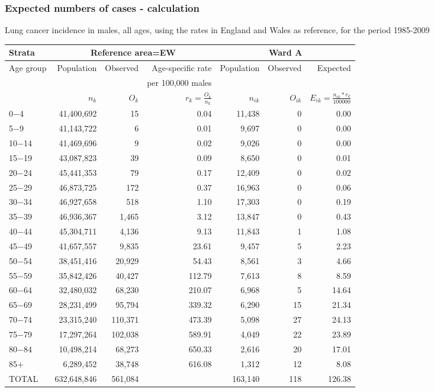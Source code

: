 \documentclass[12pt]{beamer}
\begin{document}
\begin{frame}
\frametitle{Expected numbers of cases - calculation}
\footnotesize{Lung cancer incidence in males, all ages, using the rates in England and Wales as reference, for the period 1985-2009}
\vspace{-6pt}
\begin{center}
{\tiny
\begin{tabular}{|l|rrr|rrr|}
  \hline
Strata   & \multicolumn{3}{|c|}{Reference area=EW} &  \multicolumn{3}{|c|}{Ward A}\\
  \hline
Age group & Population & Observed & Age-specific rate & Population & Observed & Expected\\
 &  & & per 100,000 males &  & & \\
 & $n_k$ & $O_k$ & $r_k=\frac{O_k}{n_k}$ & $n_{ik}$ & $O_{ik}$ & $E_{ik}=\frac{n_{ik}*r_k}{100000}$\\
\hline
0$-$4 &  41,400,692  &  15  & 0.04 &  11,438  & 0 &  0.00 \\
5$-$9 &  41,143,722  &  6  & 0.01 &  9,697  & 0 &  0.00 \\
10$-$14 &  41,469,696  &  9  & 0.02 &  9,026  & 0 &  0.00 \\
15$-$19 &  43,087,823  &  39  & 0.09 &  8,650  & 0 &  0.01 \\
20$-$24 &  45,441,353  &  79  & 0.17 &  12,409  & 0 &  0.02 \\
25$-$29 &  46,873,725  &  172  & 0.37 &  16,963  & 0 &  0.06 \\
30$-$34 &  46,927,658  &  518  & 1.10 &  17,303  & 0 &  0.19 \\
35$-$39 &  46,936,367  &  1,465  & 3.12 &  13,847  & 0 &  0.43 \\
40$-$44 &  45,304,711  &  4,136  & 9.13 &  11,843  &  1  &  1.08 \\
45$-$49 &  41,657,557  &  9,835  & 23.61 &  9,457  &  5  &  2.23 \\
50$-$54 &  38,451,416  &  20,929  & 54.43 &  8,561  &  3  &  4.66 \\
55$-$59 &  35,842,426  &  40,427  & 112.79 &  7,613  &  8  &  8.59 \\
60$-$64 &  32,480,032  &  68,230  & 210.07 &  6,968  &  5  &  14.64 \\
65$-$69 &  28,231,499  &  95,794  & 339.32 &  6,290  &  15  &  21.34 \\
70$-$74 &  23,315,240  &  110,371  & 473.39 &  5,098  &  27  &  24.13 \\
75$-$79 &  17,297,264  &  102,038  & 589.91 &  4,049  &  22  &  23.89 \\
80$-$84 &  10,498,214  &  68,273  & 650.33 &  2,616  &  20  &  17.01 \\
85$+$ &  6,289,452  &  38,748  & 616.08 &  1,312  &  12  &  8.08 \\
\hline
TOTAL &  632,648,846  &  561,084  &  &  163,140  &  {\color{red}118}  &  {\color{red}126.38} \\
\hline
\end{tabular}
}
\end{center}


\end{frame}
\end{document}
